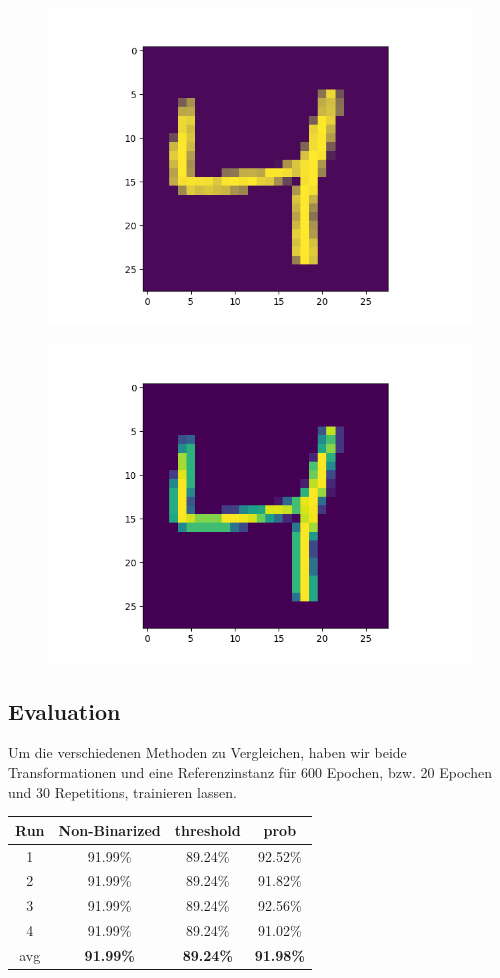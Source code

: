 \begin{figure}[h]
\centering
\begin{minipage}{.5\textwidth}
  \centering
  \includegraphics[width=.4\linewidth]{./bilder/comparison/overlapped}
  \label{fig:bin3}
\end{minipage}%
\begin{minipage}{.5\textwidth}
  \centering
  \includegraphics[width=.4\linewidth]{./bilder/comparison/default}
  \label{fig:dflt}
\end{minipage}
\end{figure}

\subsection{Evaluation}

Um die verschiedenen Methoden zu Vergleichen, haben wir beide Transformationen und eine Referenzinstanz für $600$ Epochen, bzw. 20 Epochen und 30 Repetitions, trainieren lassen.\\

	\centering
	\begin{tabular}{|c|c|c|c|}\hline
		Run & Non-Binarized    & threshold        & prob              \\\hline
		1   	& 91.99\%          & 89.24\%          & 92.52\%           \\\hline
		2   & 91.99\%          & 89.24\%          & 91.82\%           \\\hline
		3   & 91.99\%          & 89.24\%          & 92.56\%           \\\hline
		4   & 91.99\%          & 89.24\%          & 91.02\%           \\\hline
		avg & \textbf{91.99\%} & \textbf{89.24\%} & \textbf{91.98\%}  \\\hline
	\end{tabular}
	\label{fig:grph}

